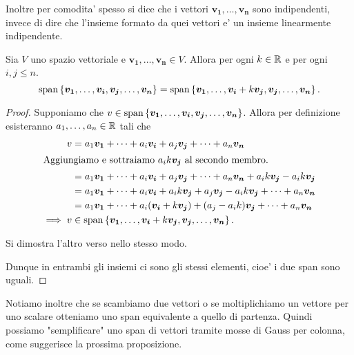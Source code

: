 Inoltre per comodita' spesso si dice che i vettori $\bm{v_1}, \dots, \bm{v_n}$ sono indipendenti, invece di dire che l'insieme formato da quei vettori e' un insieme linearmente indipendente.

\begin{proposition} \label{span_Gauss}
    Sia $V$ uno spazio vettoriale e $\bm{v_1}, \dots, \bm{v_n} \in V$. Allora per ogni $k \in \mathbb{R}$ e per ogni $i, j \leq n$.
    \begin{equation}
        \operatorname{span}\left\{\bm{v_1}, \dots, \bm{v_i}, \bm{v_j}, \dots, \bm{v_n}\right\} = \operatorname{span}\left\{\bm{v_1}, \dots, \bm{v_i} + k\bm{v_j}, \bm{v_j}, \dots, \bm{v_n}\right\}.
    \end{equation}
\end{proposition}
\begin{proof}
    Supponiamo che $v \in \operatorname{span}\left\{\bm{v_1}, \dots, \bm{v_i}, \bm{v_j}, \dots, \bm{v_n}\right\}$. Allora per definizione esisteranno $a_1, \dots, a_n \in \mathbb{R}$ tali che
    \begin{alignat*}{1}
        v &= a_1\bm{v_1} + \dots + a_i\bm{v_i} + a_j\bm{v_j} + \dots + a_n\bm{v_n} \\
        \intertext{Aggiungiamo e sottraiamo $a_ik\bm{v_j}$ al secondo membro.}
        &= a_1\bm{v_1} + \dots + a_i\bm{v_i} + a_j\bm{v_j} + \dots + a_n\bm{v_n} + a_ik\bm{v_j} - a_ik\bm{v_j}\\
        &= a_1\bm{v_1} + \dots + a_i\bm{v_i} + a_ik\bm{v_j} + a_j\bm{v_j} - a_ik\bm{v_j} + \dots + a_n\bm{v_n}\\
        &= a_1\bm{v_1} + \dots + a_i(\bm{v_i} + k\bm{v_j}) + (a_j - a_ik)\bm{v_j} + \dots + a_n\bm{v_n}\\
        \implies v &\in \operatorname{span}\left\{\bm{v_1}, \dots, \bm{v_i} + k\bm{v_j}, \bm{v_j}, \dots, \bm{v_n}\right\}. 
    \end{alignat*}

    Si dimostra l'altro verso nello stesso modo.

    Dunque in entrambi gli insiemi ci sono gli stessi elementi, cioe' i due span sono uguali.
\end{proof}

Notiamo inoltre che se scambiamo due vettori o se moltiplichiamo un vettore per uno scalare otteniamo uno span equivalente a quello di partenza. Quindi possiamo "semplificare" uno span di vettori tramite mosse di Gauss per colonna, come suggerisce la prossima proposizione.


